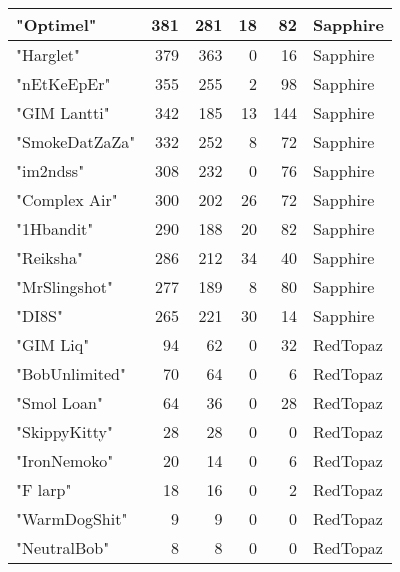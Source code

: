 \documentclass{article}
\begin{document}
\begin{table}[htbp]
\begin{tabular}{|l|r|r|r|r|l|}
"Optimel" & 381 & 281 & 18 & 82 & Sapphire \\ \hline
"Harglet" & 379 & 363 & 0 & 16 & Sapphire \\ \hline
"nEtKeEpEr" & 355 & 255 & 2 & 98 & Sapphire \\ \hline
"GIM Lantti" & 342 & 185 & 13 & 144 & Sapphire \\ \hline
"SmokeDatZaZa" & 332 & 252 & 8 & 72 & Sapphire \\ \hline
"im2ndss" & 308 & 232 & 0 & 76 & Sapphire \\ \hline
"Complex Air" & 300 & 202 & 26 & 72 & Sapphire \\ \hline
"1Hbandit" & 290 & 188 & 20 & 82 & Sapphire \\ \hline
"Reiksha" & 286 & 212 & 34 & 40 & Sapphire \\ \hline
"MrSlingshot" & 277 & 189 & 8 & 80 & Sapphire \\ \hline
"DI8S" & 265 & 221 & 30 & 14 & Sapphire \\ \hline
"GIM Liq" & 94 & 62 & 0 & 32 & RedTopaz \\ \hline
"BobUnlimited" & 70 & 64 & 0 & 6 & RedTopaz \\ \hline
"Smol Loan" & 64 & 36 & 0 & 28 & RedTopaz \\ \hline
"SkippyKitty" & 28 & 28 & 0 & 0 & RedTopaz \\ \hline
"IronNemoko" & 20 & 14 & 0 & 6 & RedTopaz \\ \hline
"F larp" & 18 & 16 & 0 & 2 & RedTopaz \\ \hline
"WarmDogShit" & 9 & 9 & 0 & 0 & RedTopaz \\ \hline
"NeutralBob" & 8 & 8 & 0 & 0 & RedTopaz \\ \hline
\end{tabular}
\end{table}
\end{document}
